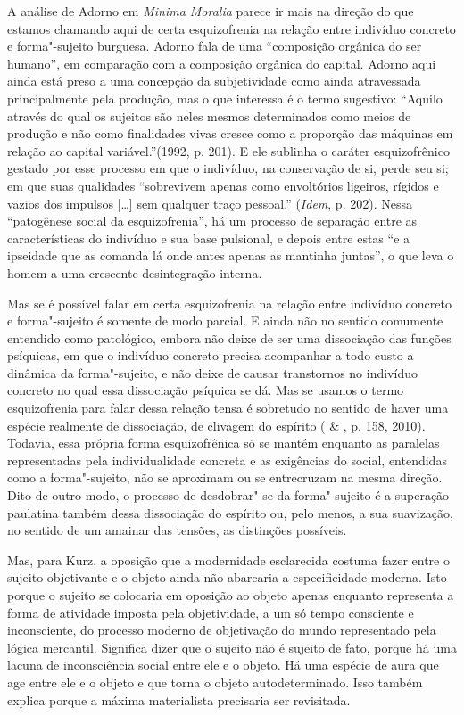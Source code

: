 A análise de Adorno em \emph{Minima Moralia} parece ir mais na direção
do que estamos chamando aqui de certa esquizofrenia na relação entre
indivíduo concreto e forma"-sujeito burguesa. Adorno fala de uma
``composição orgânica do ser humano'', em comparação com a composição
orgânica do capital. Adorno aqui ainda está preso a uma concepção da
subjetividade como ainda atravessada principalmente pela produção, mas o
que interessa é o termo sugestivo: ``Aquilo através do qual os sujeitos
são neles mesmos determinados como meios de produção e não como
finalidades vivas cresce como a proporção das máquinas em relação ao
capital variável.''(1992, p. 201). E ele sublinha o caráter
esquizofrênico gestado por esse processo em que o indivíduo, na
conservação de si, perde seu si; em que suas qualidades ``sobrevivem
apenas como envoltórios ligeiros, rígidos e vazios dos impulsos
[\ldots{}] sem qualquer traço pessoal.'' (\emph{Idem}, p. 202).
Nessa ``patogênese social da esquizofrenia'', há um processo de
separação entre as características do indivíduo e sua base pulsional, e
depois entre estas ``e a ipseidade que as comanda lá onde antes apenas
as mantinha juntas'', o que leva o homem a uma crescente desintegração
interna.

Mas se é possível falar em certa esquizofrenia na relação entre
indivíduo concreto e forma"-sujeito é somente de modo parcial. E ainda
não no sentido comumente entendido como patológico, embora não deixe de
ser uma dissociação das funções psíquicas, em que o indivíduo concreto
precisa acompanhar a todo custo a dinâmica da forma"-sujeito, e não deixe
de causar transtornos no indivíduo concreto no qual essa dissociação
psíquica se dá. Mas se usamos o termo esquizofrenia para falar dessa
relação tensa é sobretudo no sentido de haver uma espécie realmente de
dissociação, de clivagem do espírito ( \& , p. 158,
2010). Todavia, essa própria forma esquizofrênica só se mantém enquanto
as paralelas representadas pela individualidade concreta e as exigências
do social, entendidas como a forma"-sujeito, não se aproximam ou se
entrecruzam na mesma direção. Dito de outro modo, o processo de
desdobrar"-se da forma"-sujeito é a superação paulatina também dessa
dissociação do espírito ou, pelo menos, a sua suavização, no sentido de
um amainar das tensões, as distinções possíveis.

Mas, para Kurz, a oposição que a modernidade esclarecida costuma fazer
entre o sujeito objetivante e o objeto ainda não abarcaria a
especificidade moderna. Isto porque o sujeito se colocaria em oposição
ao objeto apenas enquanto representa a forma de atividade imposta pela
objetividade, a um só tempo consciente e inconsciente, do processo
moderno de objetivação do mundo representado pela lógica mercantil.
Significa dizer que o sujeito não é sujeito de fato, porque há uma
lacuna de inconsciência social entre ele e o objeto. Há uma espécie de
aura que age entre ele e o objeto e que torna o objeto autodeterminado.
Isso também explica porque a máxima materialista precisaria ser
revisitada.

